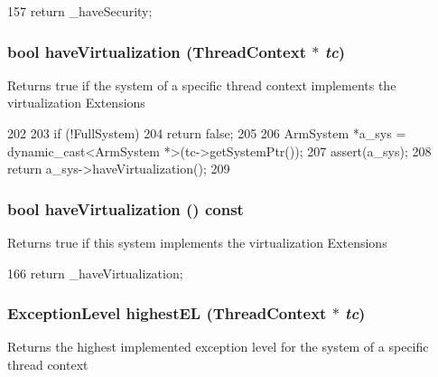 \begin{DoxyCode}
157 { return _haveSecurity; }
\end{DoxyCode}
\hypertarget{classArmSystem_a1f64894290af14b147eda414e6588005}{
\subsubsection[{haveVirtualization}]{\setlength{\rightskip}{0pt plus 5cm}bool haveVirtualization ({\bf ThreadContext} $\ast$ {\em tc})}}
\label{classArmSystem_a1f64894290af14b147eda414e6588005}
Returns true if the system of a specific thread context implements the virtualization Extensions 


\begin{DoxyCode}
202 {
203     if (!FullSystem)
204         return false;
205 
206     ArmSystem *a_sys = dynamic_cast<ArmSystem *>(tc->getSystemPtr());
207     assert(a_sys);
208     return a_sys->haveVirtualization();
209 }
\end{DoxyCode}
\hypertarget{classArmSystem_afef641e959fe33dee8702b9bb5e1b9e4}{
\subsubsection[{haveVirtualization}]{\setlength{\rightskip}{0pt plus 5cm}bool haveVirtualization () const}}
\label{classArmSystem_afef641e959fe33dee8702b9bb5e1b9e4}
Returns true if this system implements the virtualization Extensions 


\begin{DoxyCode}
166 { return _haveVirtualization; }
\end{DoxyCode}
\hypertarget{classArmSystem_afc4618ef69b2b5acf5723126b73ef1ac}{
\subsubsection[{highestEL}]{\setlength{\rightskip}{0pt plus 5cm}ExceptionLevel highestEL ({\bf ThreadContext} $\ast$ {\em tc})}}
\label{classArmSystem_afc4618ef69b2b5acf5723126b73ef1ac}
Returns the highest implemented exception level for the system of a specific thread context 


